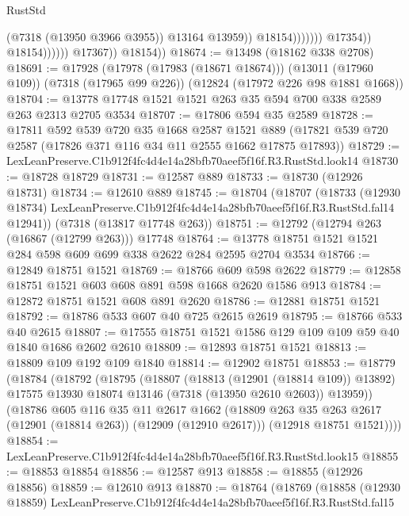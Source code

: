 \begin{lexlean}{RustStd}
\begin{coremodule}
                                              (@7318 (@13950 @3966 @3955))
                                              @13164
                                              @13959))
                                          @18154)))))))
                            @17354))
                        @18154))))))
            @17367))
        @18154))
@18674 := @13498 (@18162 @338 @2708)
@18691 := @17928
    (@17978 (@17983 (@18671 @18674)))
    (@13011 (@17960 @109))
    (@7318 (@17965 @99 @226))
    (@12824 (@17972 @226 @98 @1881 @1668))
@18704 := @13778 @17748 @1521 @1521 @263 @35 @594 @700 @338 @2589 @263 @2313 @2705 @3534
@18707 := @17806 @594 @35 @2589
@18728 := @17811
    @592
    @539
    @720
    @35
    @1668
    @2587
    @1521
    @889
    (@17821 @539 @720 @2587 (@17826 @371 @116 @34 @11 @2555 @1662 @17875 @17893))
@18729 := LexLeanPreserve.C1b912f4fc4d4e14a28bfb70aeef5f16f.R3.RustStd.look14
@18730 := @18728 @18729
@18731 := @12587 @889
@18733 := @18730 (@12926 @18731)
@18734 := @12610 @889
@18745 := @18704
    (@18707
      (@18733
        (@12930 @18734)
        LexLeanPreserve.C1b912f4fc4d4e14a28bfb70aeef5f16f.R3.RustStd.fal14
        @12941))
    (@7318 (@13817 @17748 @263))
@18751 := @12792 (@12794 @263 (@16867 (@12799 @263))) @17748
@18764 := @13778 @18751 @1521 @1521 @284 @598 @609 @699 @338 @2622 @284 @2595 @2704 @3534
@18766 := @12849 @18751 @1521
@18769 := @18766 @609 @598 @2622
@18779 := @12858 @18751 @1521 @603 @608 @891 @598 @1668 @2620 @1586 @913
@18784 := @12872 @18751 @1521 @608 @891 @2620
@18786 := @12881 @18751 @1521
@18792 := @18786 @533 @607 @40 @725 @2615 @2619
@18795 := @18766 @533 @40 @2615
@18807 := @17555 @18751 @1521 @1586 @129 @109 @109 @59 @40 @1840 @1686 @2602 @2610
@18809 := @12893 @18751 @1521
@18813 := @18809 @109 @192 @109 @1840
@18814 := @12902 @18751
@18853 := @18779
    (@18784
      (@18792
        (@18795
          (@18807
            (@18813 (@12901 (@18814 @109)) @13892)
            @17575
            @13930
            @18074
            @13146
            (@7318 (@13950 @2610 @2603))
            @13959))
        (@18786
          @605
          @116
          @35
          @11
          @2617
          @1662
          (@18809 @263 @35 @263 @2617 (@12901 (@18814 @263)) (@12909 (@12910 @2617)))
          (@12918 @18751 @1521))))
@18854 := LexLeanPreserve.C1b912f4fc4d4e14a28bfb70aeef5f16f.R3.RustStd.look15
@18855 := @18853 @18854
@18856 := @12587 @913
@18858 := @18855 (@12926 @18856)
@18859 := @12610 @913
@18870 := @18764
    (@18769
      (@18858
        (@12930 @18859)
        LexLeanPreserve.C1b912f4fc4d4e14a28bfb70aeef5f16f.R3.RustStd.fal15

\end{coremodule}
\end{lexlean}
